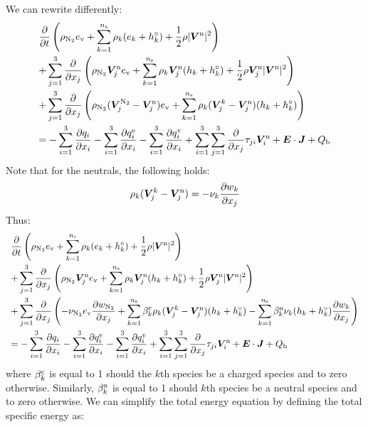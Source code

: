 \documentclass{warpdoc}
\newcommand{\alb}{\vspace{0.1cm}\\} %
\newcommand{\mfd}{\displaystyle}
\newcommand{\ns}{{n_{\rm s}}}
\newcommand{\ev}{{e_{\rm v}}}
\renewcommand{\vec}[1]{\bm{#1}}
\begin{document}
%  
We can rewrite differently:
%
\begin{equation}
\begin{array}{l}\mfd
 \frac{\partial }{\partial t}\left(\rho_{\rm N_2} \ev+\sum_{k=1}^\ns \rho_k (e_k+h_k^\circ)+\frac{1}{2}\rho|\vec{V}^{\rm n}|^2 \right) \alb\mfd
+ \sum_{j=1}^3  \frac{\partial }{\partial x_j} \left(\rho_{\rm N_2} \vec{V}_j^{\rm n} \ev + \sum_{k=1}^\ns \rho_k \vec{V}^{\rm n}_j (h_k+h_k^\circ)+\frac{1}{2}\rho \vec{V}^{\rm n}_j|\vec{V}^{\rm n}|^2 \right)\alb\mfd
+ \sum_{j=1}^3  \frac{\partial }{\partial x_j} \left(\rho_{\rm N_2} (\vec{V}_j^{\rm N_2}-\vec{V}_j^{\rm n}) \ev + \sum_{k=1}^\ns \rho_k (\vec{V}^k_j-\vec{V}^{\rm n}_j) (h_k+h_k^\circ) \right)
 \alb\mfd
=
-\sum_{i=1}^{3}\frac{\partial q_i}{\partial x_i}
-  \sum_{i=1}^{3}\frac{\partial q_i^{\rm e}}{\partial x_i}
-\sum_{i=1}^{3}\frac{\partial q_i^{\rm v}}{\partial x_i}
+\sum_{i=1}^3 \sum_{j=1}^3  \frac{\partial }{\partial x_j} \tau_{ji} \vec{V}_i^{\rm n}
+ \vec{E}\cdot\vec{J}
+ Q_{\rm b}
\end{array}
\label{eqn:etotal5}
\end{equation}
%  
Note that for the neutrals, the following holds:
%
\begin{equation}
\rho_k (\vec{V}_j^k-\vec{V}_j^{\rm n}) =  - \nu_k \frac{\partial w_k}{\partial x_j}
\end{equation}
%
Thus:
%
\begin{equation}
\begin{array}{l}\mfd
 \frac{\partial }{\partial t}\left(\rho_{\rm N_2} \ev+\sum_{k=1}^\ns \rho_k (e_k+h_k^\circ)+\frac{1}{2}\rho|\vec{V}^{\rm n}|^2 \right) \alb\mfd
+ \sum_{j=1}^3  \frac{\partial }{\partial x_j} \left(\rho_{\rm N_2} \vec{V}_j^{\rm n} \ev + \sum_{k=1}^\ns \rho_k \vec{V}^{\rm n}_j (h_k+h_k^\circ)+\frac{1}{2}\rho \vec{V}^{\rm n}_j|\vec{V}^{\rm n}|^2 \right)\alb\mfd
+ \sum_{j=1}^3  \frac{\partial }{\partial x_j} \left(-\nu_{\rm N_2} \ev\frac{\partial w_{\rm N_2}}{\partial x_j} + \sum_{k=1}^\ns \beta_k^{\rm c} \rho_k (\vec{V}^k_j-\vec{V}^{\rm n}_j) (h_k+h_k^\circ) 
- \sum_{k=1}^\ns \beta_k^{\rm n} \nu_k (h_k+h_k^\circ)\frac{\partial w_k}{\partial x_j} 
\right)
 \alb\mfd
=
-\sum_{i=1}^{3}\frac{\partial q_i}{\partial x_i}
-  \sum_{i=1}^{3}\frac{\partial q_i^{\rm e}}{\partial x_i}
-\sum_{i=1}^{3}\frac{\partial q_i^{\rm v}}{\partial x_i}
+\sum_{i=1}^3 \sum_{j=1}^3  \frac{\partial }{\partial x_j} \tau_{ji} \vec{V}_i^{\rm n}
+ \vec{E}\cdot\vec{J}
+ Q_{\rm b}
\end{array}
\label{eqn:etotal6}
\end{equation}
%  
where $\beta^{\rm c}_k$ is equal to 1 should the $k$th species be a charged species and to zero otherwise. Similarly, $\beta_k^{\rm n}$ is equal to 1 should $k$th species be a neutral species and to zero otherwise. We can simplify the total energy equation by defining the total specific energy as:
\end{document}
